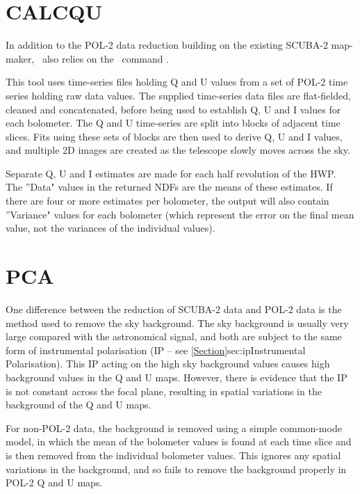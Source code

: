 \section{CALCQU}
\label{sec:calcqu}

In addition to the POL-2 data reduction building on the
existing SCUBA-2 map-maker, \poltwomap\ also relies on the \SMURF\
command .

This  tool uses time-series files holding Q
and U values from a set of POL-2 time series holding raw data values.
The supplied time-series data files are flat-fielded, cleaned and concatenated,
before being used to establish Q, U and I values for each bolometer. The Q
and U time-series are split into blocks of adjacent time slices. Fits
using these sets of blocks are then used to derive Q, U and I values, and
multiple 2D images are created as the telescope slowly moves across the sky.

Separate Q, U and I estimates are made for each half revolution of the HWP.
The ''Data" values in the returned NDFs are the means of these estimates. If
there are four or more estimates per bolometer, the output will also contain
''Variance" values for each bolometer (which represent the error on
the final mean value, not the variances of the individual values).

\section{PCA}
\label{sec:pca}

One difference between the reduction of SCUBA-2 data and POL-2 data is the
method used to remove the sky background.  The sky background is usually
very large compared with the astronomical signal, and both are subject to
the same form of instrumental polarisation (IP -- see
\cref{Section}{sec:ip}{Instrumental Polarisation}). This
IP acting on the high sky background values causes high background values
in the Q and U maps. However, there is evidence that the IP is not
constant across the focal plane, resulting in spatial variations in the
background of the Q and U maps.

For non-POL-2 data, the background is removed using a simple common-mode
model, in which the mean of the bolometer values is found at each time
slice and is then removed from the individual bolometer values. This
ignores any spatial variations in the background, and so fails to remove
the background properly in POL-2 Q and U maps.

